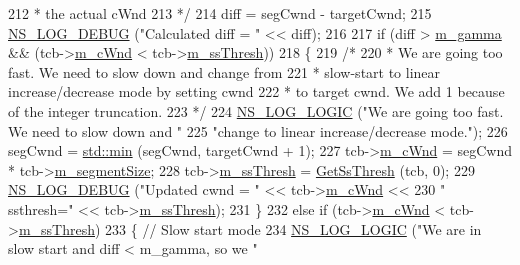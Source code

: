 \begin{DoxyCode}
212 \textcolor{comment}{           * the actual cWnd}
213 \textcolor{comment}{           */}
214           diff = segCwnd - targetCwnd;
215           \hyperlink{group__logging_ga413f1886406d49f59a6a0a89b77b4d0a}{NS\_LOG\_DEBUG} (\textcolor{stringliteral}{"Calculated diff = "} << diff);
216 
217           \textcolor{keywordflow}{if} (diff > \hyperlink{classns3_1_1TcpVegas_ae3ea97171ce6954d2b607f6bc8b9239c}{m\_gamma} && (tcb->\hyperlink{classns3_1_1TcpSocketState_a7cd3d2156a483c1db436097477a0fd7f}{m\_cWnd} < tcb->\hyperlink{classns3_1_1TcpSocketState_aec003b6dba9d269bfb1036c7652ffbd6}{m\_ssThresh}))
218             \{
219               \textcolor{comment}{/*}
220 \textcolor{comment}{               * We are going too fast. We need to slow down and change from}
221 \textcolor{comment}{               * slow-start to linear increase/decrease mode by setting cwnd}
222 \textcolor{comment}{               * to target cwnd. We add 1 because of the integer truncation.}
223 \textcolor{comment}{               */}
224               \hyperlink{group__logging_ga88acd260151caf2db9c0fc84997f45ce}{NS\_LOG\_LOGIC} (\textcolor{stringliteral}{"We are going too fast. We need to slow down and "}
225                             \textcolor{stringliteral}{"change to linear increase/decrease mode."});
226               segCwnd = \hyperlink{80211b_8c_ac6afabdc09a49a433ee19d8a9486056d}{std::min} (segCwnd, targetCwnd + 1);
227               tcb->\hyperlink{classns3_1_1TcpSocketState_a7cd3d2156a483c1db436097477a0fd7f}{m\_cWnd} = segCwnd * tcb->\hyperlink{classns3_1_1TcpSocketState_a079872f7b0099ef5f3cab4ff47bd2edd}{m\_segmentSize};
228               tcb->\hyperlink{classns3_1_1TcpSocketState_aec003b6dba9d269bfb1036c7652ffbd6}{m\_ssThresh} = \hyperlink{classns3_1_1TcpVegas_af42952eb204ae641900b1d0ef4d39d97}{GetSsThresh} (tcb, 0);
229               \hyperlink{group__logging_ga413f1886406d49f59a6a0a89b77b4d0a}{NS\_LOG\_DEBUG} (\textcolor{stringliteral}{"Updated cwnd = "} << tcb->\hyperlink{classns3_1_1TcpSocketState_a7cd3d2156a483c1db436097477a0fd7f}{m\_cWnd} <<
230                             \textcolor{stringliteral}{" ssthresh="} << tcb->\hyperlink{classns3_1_1TcpSocketState_aec003b6dba9d269bfb1036c7652ffbd6}{m\_ssThresh});
231             \}
232           \textcolor{keywordflow}{else} \textcolor{keywordflow}{if} (tcb->\hyperlink{classns3_1_1TcpSocketState_a7cd3d2156a483c1db436097477a0fd7f}{m\_cWnd} < tcb->\hyperlink{classns3_1_1TcpSocketState_aec003b6dba9d269bfb1036c7652ffbd6}{m\_ssThresh})
233             \{     \textcolor{comment}{// Slow start mode}
234               \hyperlink{group__logging_ga88acd260151caf2db9c0fc84997f45ce}{NS\_LOG\_LOGIC} (\textcolor{stringliteral}{"We are in slow start and diff < m\_gamma, so we "}

\end{DoxyCode}
